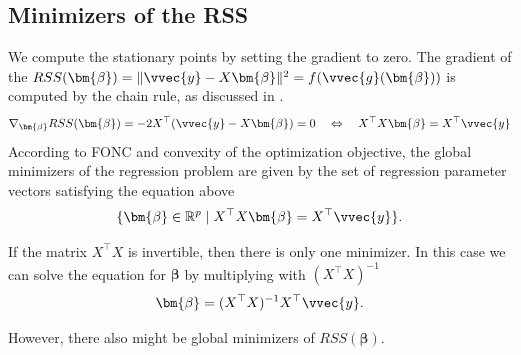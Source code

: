 \documentclass[letterpaper,10pt,english]{jupyterBook}
\begin{document}
\subsection{Minimizers of the RSS}
\label{\detokenize{regression_optimization:minimizers-of-the-rss}}
\sphinxAtStartPar
We compute the stationary points by setting the gradient to zero. The gradient of the \(RSS(\bm{\beta}) = \lVert \vvec{y}-X\bm{\beta}\rVert^2=f(\vvec{g}(\bm{\beta}))\) is computed by the chain rule, as discussed in {\hyperref[\detokenize{optimization_exercises:opt-exercises-gradients}]{}}.
\begin{equation}\label{equation:regression_optimization:eq:minimizers}
\begin{split}\begin{align*}
\nabla_{\bm{\beta}} RSS(\bm{\beta})= -2X^\top(\vvec{y}-X\bm{\beta}) =0 
\quad \Leftrightarrow \quad
     X^\top X{\bm{\beta}} = X^\top \vvec{y}
\end{align*}\end{split}
\end{equation}
\sphinxAtStartPar
According to FONC and convexity of the optimization objective, the global minimizers of the regression problem are given by the set of regression parameter vectors satisfying the equation above
\begin{equation*}
\begin{split}\{\bm{\beta}\in\mathbb{R}^p\mid X^\top X\bm{\beta} =X^\top\vvec{y} \}.\end{split}
\end{equation*}

\sphinxAtStartPar
If the matrix \(X^\top X\) is invertible, then there is only one minimizer. In this case we can solve the equation for \(\bm{\beta}\) by multiplying with \((X^\top X)^{-1}\)
\begin{equation*}
\begin{split}\bm{\beta}= (X^\top X)^{-1}X^\top\vvec{y}.\end{split}
\end{equation*}

\sphinxAtStartPar
However, there also might be  global minimizers of \(RSS(\bm{\beta})\).
\end{document}
